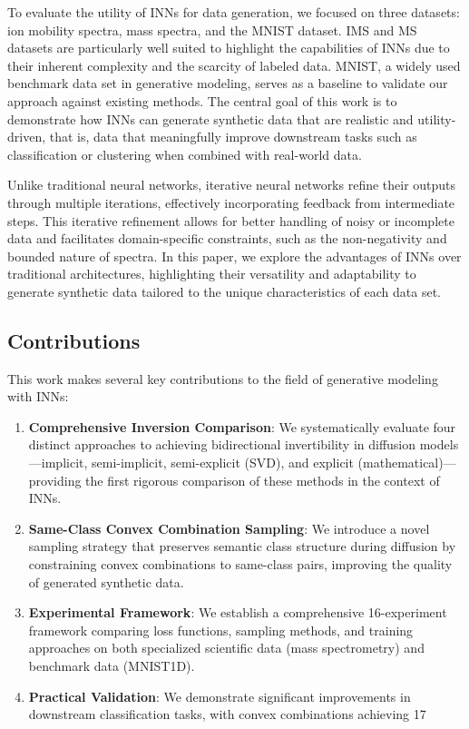 \documentclass[sigconf]{acmart}
\begin{document}
To evaluate the utility of INNs for data generation, we focused on three datasets: ion mobility spectra, mass spectra, and the MNIST dataset. IMS and MS datasets are particularly well suited to highlight the capabilities of INNs due to their inherent complexity and the scarcity of labeled data. MNIST, a widely used benchmark data set in generative modeling, serves as a baseline to validate our approach against existing methods. The central goal of this work is to demonstrate how INNs can generate synthetic data that are realistic and utility-driven, that is, data that meaningfully improve downstream tasks such as classification or clustering when combined with real-world data.\cite{Vadakedath2022MS}

Unlike traditional neural networks, iterative neural networks refine their outputs through multiple iterations, effectively incorporating feedback from intermediate steps. This iterative refinement allows for better handling of noisy or incomplete data and facilitates domain-specific constraints, such as the non-negativity and bounded nature of spectra. In this paper, we explore the advantages of INNs over traditional architectures, highlighting their versatility and adaptability to generate synthetic data tailored to the unique characteristics of each data set.\cite{hershey2024rethinking}

\subsection{Contributions}

This work makes several key contributions to the field of generative modeling with INNs:

\begin{enumerate}
    \item \textbf{Comprehensive Inversion Comparison}: We systematically evaluate four distinct approaches to achieving bidirectional invertibility in diffusion models—implicit, semi-implicit, semi-explicit (SVD), and explicit (mathematical)—providing the first rigorous comparison of these methods in the context of INNs.
    
    \item \textbf{Same-Class Convex Combination Sampling}: We introduce a novel sampling strategy that preserves semantic class structure during diffusion by constraining convex combinations to same-class pairs, improving the quality of generated synthetic data.
    
    \item \textbf{Experimental Framework}: We establish a comprehensive 16-experiment framework comparing loss functions, sampling methods, and training approaches on both specialized scientific data (mass spectrometry) and benchmark data (MNIST1D).
    
    \item \textbf{Practical Validation}: We demonstrate significant improvements in downstream classification tasks, with convex combinations achieving 17%
\end{enumerate}
\end{document}
